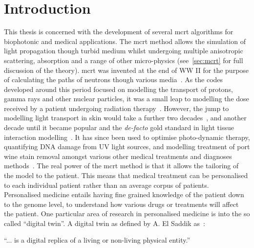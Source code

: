 \chapter{Introduction}


%
%
%
This thesis is concerned with the development of several \gls*{mcrt} algorithms for biophotonic and medical applications.
The \gls*{mcrt} method allows the simulation of light propagation though turbid medium whilst undergoing multiple anisotropic scattering, absorption and a range of other micro-physics (see~\cref{sec:mcrt} for full discussion of the theory).
\Gls*{mcrt} was invented at the end of WW II for the purpose of calculating the paths of neutrons though various media~\cite{montybeg1,eckhardt1987stan,anderson1986metropolis,ulam1947statistical}.
As the codes developed around this period focused on modelling the transport of protons, gamma rays and other nuclear particles, it was a small leap to modelling the dose received by a patient undergoing radiation therapy~\cite{ellett1964gamma}.
However, the jump to modelling light transport in skin would take a further two decades~\cite{wilson1983monte}, and another decade until it became popular and the \textit{de-facto} gold standard in light tissue interaction modelling~\cite{wang1995mcml,key1991monte}.
It has since been used to optimise photo-dynamic therapy, quantifying DNA damage from UV light sources, and modelling treatment of port wine stain removal amongst various other medical treatments and diagnoses methods~\cite{barnard2018quantifying,smithies1995modelling,campbell2015monte}.
The real power of the \gls*{mcrt} method is that it allows the tailoring of the model to the patient.
This means that medical treatment can be personalised to each individual patient rather than an average corpus of patients.\\


Personalised medicine entails having fine grained knowledge of the patient down to the genome level, to understand how various drugs or treatments will affect the patient.
One particular area of research in personalised medicine is into the so called ``digital twin''.
A digital twin as defined by A. El Saddik as~\cite{el2018digital}:

\medskip
``... is a digital replica of a living or non-living physical entity.''
\medskip

